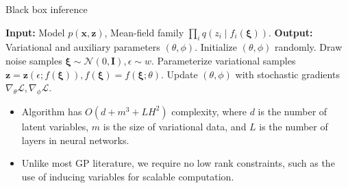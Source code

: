 \documentclass{beamer}
\begin{document}
\begin{frame}{Black box inference}
\begin{algorithm}[H]
\caption{Black box inference with a variational Gaussian process}
\begin{algorithmic}[1]
    \State \textbf{Input:} Model $p(\mathbf{x}, \mathbf{z})$, Mean-field family $\prod_i q(z_i \mid f_i(\boldsymbol{\xi}))$.
    \State \textbf{Output:} Variational and auxiliary parameters $(\theta, \phi)$.
    \State Initialize $(\theta, \phi)$ randomly.
        \State Draw noise samples $\boldsymbol{\xi} \sim \mathcal{N}(0, \mathbf{I}), \epsilon \sim w$.
        \State Parameterize variational samples $\mathbf{z} = \mathbf{z}(\epsilon; f(\boldsymbol{\xi})), f(\boldsymbol{\xi}) = f(\boldsymbol{\xi}; \theta)$.
        \State Update $(\theta, \phi)$ with stochastic gradients $\nabla_\theta \mathcal{L}, \nabla_\phi \mathcal{L}$.
    \EndWhile
\end{algorithmic}
\end{algorithm}

\begin{itemize}
    \item Algorithm has $O(d + m^3 + LH^2)$ complexity, where $d$ is the number of latent variables, $m$ is the size of variational data, and $L$ is the number of layers in neural networks.
    \item Unlike most GP literature, we require no low rank constraints, such as the use of inducing variables for scalable computation.
\end{itemize}

\end{frame}
\end{document}
